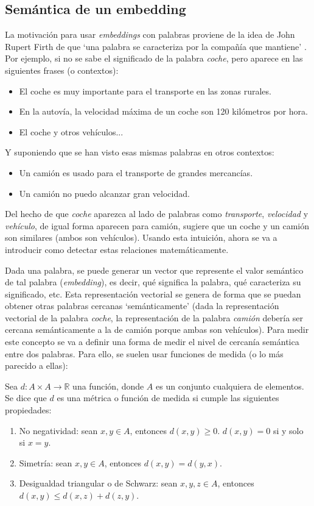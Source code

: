 \subsection*{Semántica de un embedding}

La motivación para usar \textit{embeddings} con palabras proviene de la idea de John Rupert
Firth de que `una palabra se caracteriza por la compañía que mantiene' \cite{firth1957synopsis}. Por ejemplo, si no se sabe
el significado de la palabra \textit{coche}, pero aparece en las siguientes frases (o contextos):
\begin{itemize}
    \item El coche es muy importante para el transporte en las zonas rurales.
    \item En la autovía, la velocidad máxima de un coche son 120 kilómetros por hora.
    \item El coche y otros vehículos...
\end{itemize}
Y suponiendo que se han visto esas mismas palabras en otros contextos:
\begin{itemize}
    \item Un camión es usado para el transporte de grandes mercancías.
    \item Un camión no puedo alcanzar gran velocidad.
\end{itemize}
Del hecho de que \textit{coche} aparezca al lado de palabras como \textit{transporte}, \textit{velocidad} y \textit{vehículo},
de igual forma aparecen para camión, sugiere que un coche y un camión son similares (ambos son vehículos). Usando esta intuición,
ahora se va a introducir como detectar estas relaciones matemáticamente.

Dada una palabra, se puede generar un vector que represente el valor semántico de tal palabra (\textit{embedding}), es decir, qué significa la palabra, qué caracteriza
su significado, etc. Esta representación vectorial se genera de forma que se puedan obtener otras palabras
cercanas `semánticamente' (dada la representación vectorial de la palabra \textit{coche}, la representación de la palabra \textit{camión}
debería ser cercana semánticamente a la de camión porque ambas son vehículos). Para medir este concepto se va a definir una forma de medir el nivel
de cercanía semántica entre dos palabras. Para ello, se suelen usar funciones de medida (o lo más parecido a ellas):

\begin{definition}
    Sea $d: A\times A \longrightarrow \mathbb{R}$ una función, donde $A$ es un conjunto cualquiera de elementos. Se dice que $d$ es una métrica o función
    de medida si cumple las siguientes propiedades:
    \begin{enumerate}
        \item No negatividad: sean $x,y\in A$, entonces $d(x,y)\geq 0$. $d(x,y)=0$ si y solo si $x=y$.
        \item Simetría: sean $x,y\in A$, entonces $d(x,y) = d(y,x)$.
        \item Desigualdad triangular o de Schwarz: sean $x,y,z\in A$, entonces $d(x,y) \leq d(x,z) + d(z,y)$.
    \end{enumerate}
\end{definition}

